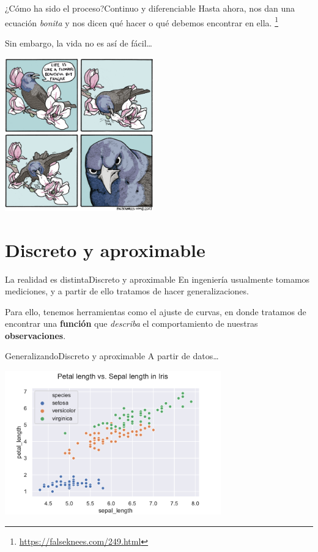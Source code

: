 \documentclass[spanish, c]{beamer}
\newcommand\blfootnote[1]{%
\begingroup
\renewcommand\thefootnote{}\footnote{#1}%
\addtocounter{footnote}{-1}%
\endgroup
}
\begin{document}
\begin{frame}{¿Cómo ha sido el proceso?}{Continuo y diferenciable}
    Hasta ahora, nos dan una ecuación \textit{bonita} y nos dicen qué hacer o qué debemos encontrar en ella. \blfootnote{\url{https://falseknees.com/249.html}}
    Sin embargo, la vida no es así de fácil\dots
    \begin{center}
        \includegraphics[width=0.48\textwidth]{beautifulbutfragile.png}
    \end{center}

\end{frame}

\section{Discreto y aproximable}

\begin{frame}{La realidad es distinta}{Discreto y aproximable}
    En ingeniería usualmente tomamos mediciones, y a partir de ello tratamos de hacer generalizaciones. \pause

    \bigskip

    Para ello, tenemos herramientas como el \alert{ajuste de curvas}, en donde tratamos de encontrar una \textbf{función} que \textit{describa} el comportamiento de nuestras \textbf{observaciones}.
\end{frame}

\begin{frame}{Generalizando}{Discreto y aproximable}
    A partir de datos\dots

    \begin{center}
        \includegraphics[width=0.7\textwidth]{scatter.pdf}
    \end{center}
    

\end{frame}
\end{document}
